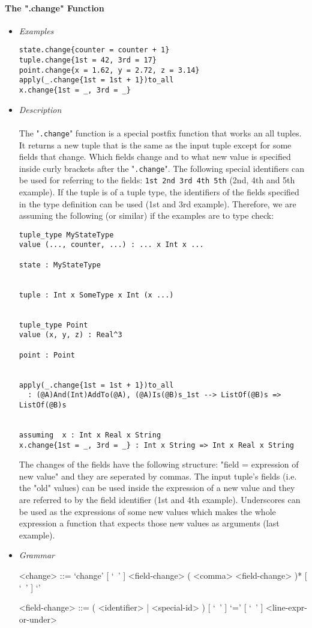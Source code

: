 \documentclass{article}
\begin{document}
\paragraph{The ".change" Function}

\begin{itemize}

\item \textit{Examples}

\begin{verbatim}
state.change{counter = counter + 1} 
tuple.change{1st = 42, 3rd = 17}
point.change{x = 1.62, y = 2.72, z = 3.14}
apply(_.change{1st = 1st + 1})to_all
x.change{1st = _, 3rd = _}
\end{verbatim}

\item \textit{Description} \\\\
The "\texttt{.change}" function is a special postfix function that works an all
tuples. It returns a new tuple that is the same as the input tuple except for
some fields that change. Which fields change and to what new value is specified
inside curly brackets after the "\texttt{.change}". The following special
identifiers can be used for referring to the fields: \texttt{1st 2nd 3rd 4th
5th} (2nd, 4th and 5th example). If the tuple is of a tuple type, the
identifiers of the fields specified in the type definition can be used (1st and
3rd example).  Therefore, we are assuming the following (or similar) if the
examples are to type check:

\begin{verbatim}
tuple_type MyStateType
value (..., counter, ...) : ... x Int x ...

state : MyStateType


tuple : Int x SomeType x Int (x ...)


tuple_type Point
value (x, y, z) : Real^3

point : Point


apply(_.change{1st = 1st + 1})to_all
  : (@A)And(Int)AddTo(@A), (@A)Is(@B)s_1st --> ListOf(@B)s => ListOf(@B)s


assuming  x : Int x Real x String
x.change{1st = _, 3rd = _} : Int x String => Int x Real x String
\end{verbatim}
The changes of the fields have the following structure: "field = expression of
new value" and they are seperated by commas. The input tuple's fields (i.e. the
"old" values) can be used inside the expression of a new value and they are
referred to by the field identifier (1st and 4th example). Underscores can be 
used as the expressions of some new values which makes the whole expression 
a function that expects those new values as arguments (last example).
\item \textit{Grammar}

\begin{grammar}
<change> ::=
`change{' [ `\ ' ] <field-change> ( <comma> <field-change> )* [ `\ ' ] `}'

<field-change> ::=
( <identifier> | <special-id> ) [ `\ ' ] `=' [ `\ ' ] <line-expr-or-under>
\end{grammar} 

\end{itemize}
\end{document}
